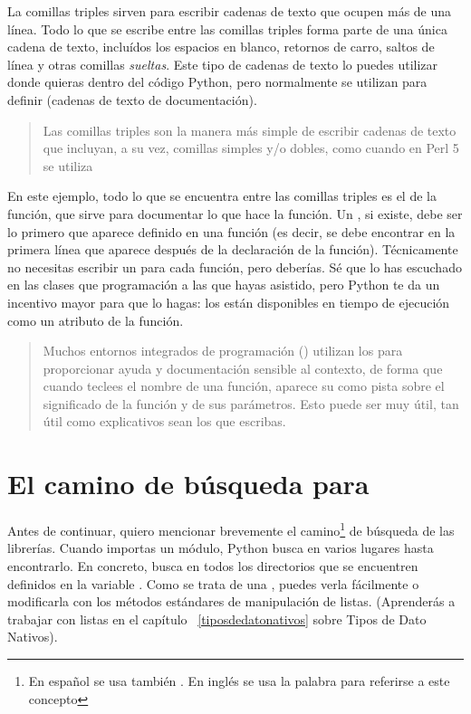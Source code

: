 La comillas triples sirven para escribir cadenas de texto que ocupen más de una línea. Todo lo que se escribe entre las comillas triples forma parte de una única cadena de texto, incluídos los espacios en blanco, retornos de carro, saltos de línea y otras comillas \emph{sueltas}. Este tipo de cadenas de texto lo puedes utilizar donde quieras dentro del código Python, pero normalmente se utilizan para definir  (cadenas de texto de documentación).

\begin{quote}
Las comillas triples son la manera más simple de escribir cadenas de texto que incluyan, a su vez, comillas simples y/o dobles, como cuando en Perl 5 se utiliza 
\end{quote}


En este ejemplo, todo lo que se encuentra entre las comillas triples es el  de la función, que sirve para documentar lo que hace la función. Un , si existe, debe ser lo primero que aparece definido en una función (es decir, se debe encontrar en la primera línea que aparece después de la declaración de la función). Técnicamente no necesitas escribir un  para cada función, pero deberías. Sé que lo has escuchado en las clases que programación a las que hayas asistido, pero Python te da un incentivo mayor para que lo hagas: los  están disponibles en tiempo de ejecución como un atributo de la función.

\begin{quote}
Muchos entornos integrados de programación () utilizan los  para proporcionar ayuda y documentación sensible al contexto, de forma que cuando teclees el nombre de una función, aparece su  como pista sobre el significado de la función y de sus parámetros. Esto puede ser muy útil, tan útil como explicativos sean los  que escribas.
\end{quote}

\section{El camino de búsqueda para }

Antes de continuar, quiero mencionar brevemente el camino\footnote{En español se usa también . En inglés se usa la palabra  para referirse a este concepto} de búsqueda de las librerías. Cuando importas un módulo, Python busca en varios lugares hasta encontrarlo. En concreto, busca en todos los directorios que se encuentren definidos en la variable . Como se trata de una , puedes verla fácilmente o modificarla con los métodos estándares de manipulación de listas. (Aprenderás a trabajar con listas en el capítulo ~\ref{tiposdedatonativos} sobre Tipos de Dato Nativos).

